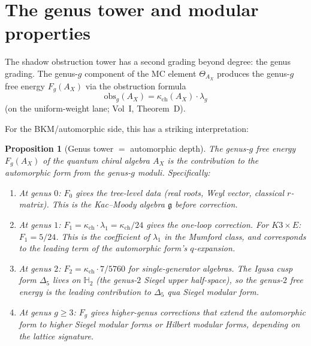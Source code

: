 \documentclass[11pt]{amsart}
\newtheorem{proposition}[theorem]{Proposition}
\theoremstyle{definition}
\theoremstyle{remark}
\newcommand{\fg}{\mathfrak{g}}
\begin{document}
\section{The genus tower and modular properties}
\label{sec:genus-tower}

The shadow obstruction tower has a second grading beyond degree: the genus
grading. The genus-$g$ component of the MC element
$\Theta_{A_X}$ produces the genus-$g$ free energy $F_g(A_X)$
via the obstruction formula
\[
 \mathrm{obs}_g(A_X) = \kappa_{\mathrm{ch}}(A_X) \cdot \lambda_g
\]
(on the uniform-weight lane; Vol~I, Theorem~D).

For the BKM/automorphic side, this has a striking
interpretation:

\begin{proposition}[Genus tower $=$ automorphic
 depth]\label{prop:genus-depth}
The genus-$g$ free energy $F_g(A_X)$ of the quantum chiral
algebra $A_X$ is the contribution to the automorphic form
from the genus-$g$ moduli. Specifically:
\begin{enumerate}[label=(\roman*)]
 \item At genus $0$: $F_0$ gives the tree-level data
 (real roots, Weyl vector, classical $r$-matrix). This is
 the Kac--Moody algebra $\fg$ before correction.

 \item At genus $1$: $F_1 = \kappa_{\mathrm{ch}} \cdot \lambda_1 =
 \kappa_{\mathrm{ch}}/24$ gives the one-loop correction. For
 $K3 \times E$: $F_1 = 5/24$. This is the coefficient
 of $\lambda_1$ in the Mumford class, and corresponds to
 the leading term of the automorphic form's $q$-expansion.

 \item At genus $2$: $F_2 = \kappa_{\mathrm{ch}} \cdot 7/5760$ for
 single-generator algebras. The Igusa cusp form
 $\Delta_5$ lives on $\mathbb{H}_2$ (the genus-$2$ Siegel
 upper half-space), so the genus-$2$ free energy is the
 leading contribution to $\Delta_5$ qua Siegel modular form.

 \item At genus $g \geq 3$: $F_g$ gives higher-genus
 corrections that extend the automorphic form to higher
 Siegel modular forms or Hilbert modular forms, depending
 on the lattice signature.
\end{enumerate}
\end{proposition}
\end{document}
